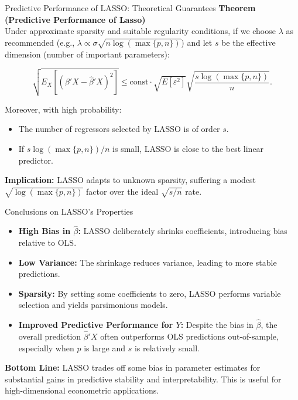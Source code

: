 \documentclass[xcolor=svgnames,t]{beamer}
\begin{document}
    
        \begin{frame}{Predictive Performance of LASSO: Theoretical Guarantees}
            \textbf{Theorem (Predictive Performance of Lasso)}\\[5pt]
            Under approximate sparsity and suitable regularity conditions, if we choose $\lambda$ as recommended (e.g., $\lambda \propto \sigma \sqrt{n\log(\max\{p,n\})}$) and let $s$ be the effective dimension (number of important parameters):
            
            \[
            \sqrt{E_X[(\beta'X - \widehat{\beta}'X)^2]} \leq \text{const} \cdot \sqrt{E[\varepsilon^2]} \sqrt{\frac{s \log(\max\{p,n\})}{n}}.
            \]
            
            Moreover, with high probability:
            \begin{itemize}
                \item The number of regressors selected by LASSO is of order $s$.
                \item If $s \log(\max\{p,n\})/n$ is small, LASSO is close to the best linear predictor.
            \end{itemize}
            
            \pause
            
            \textbf{Implication:} LASSO adapts to unknown sparsity, suffering a modest $\sqrt{\log(\max\{p,n\})}$ factor over the ideal $\sqrt{s/n}$ rate.
            \end{frame}
            
            
            \begin{frame}{Conclusions on LASSO’s Properties}
            \begin{itemize}
                \item \textbf{High Bias in $\widehat{\beta}$:} LASSO deliberately shrinks coefficients, introducing bias relative to OLS.
                \pause
                \item \textbf{Low Variance:} The shrinkage reduces variance, leading to more stable predictions.
                \pause
                \item \textbf{Sparsity:} By setting some coefficients to zero, LASSO performs variable selection and yields parsimonious models.
                \pause
                \item \textbf{Improved Predictive Performance for $Y$:} Despite the bias in $\widehat{\beta}$, the overall prediction $\widehat{\beta}'X$ often outperforms OLS predictions out-of-sample, especially when $p$ is large and $s$ is relatively small.
            \end{itemize}
            
            \textbf{Bottom Line:} LASSO trades off some bias in parameter estimates for substantial gains in predictive stability and interpretability. This is useful for high-dimensional econometric applications.
            \end{frame}
            
\end{document}
